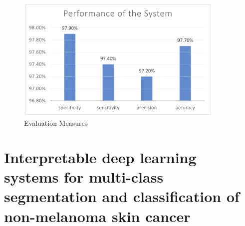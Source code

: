 \begin{figure}[htbp]
\begin{center}
\includegraphics[width=10cm]{./chapter-03-state-of-the-art/evaluation.png}
\end{center}
\caption{Evaluation Measures}
\label{fig:evaluation}
\end{figure}









\section{Interpretable deep learning systems for multi-class segmentation and classification of non-melanoma skin cancer}


